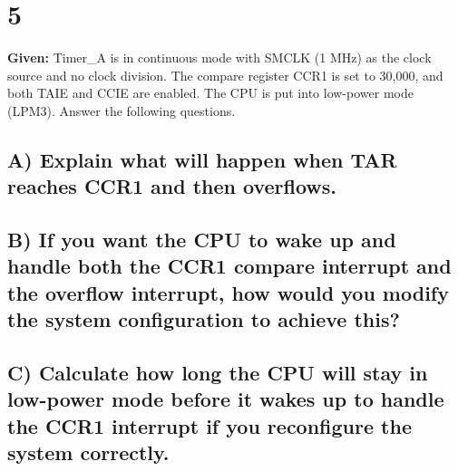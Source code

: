 \documentclass{article}
\begin{document}
\section{5}
\textbf{Given:} Timer\_A is in continuous mode with SMCLK (1 MHz) as the clock source and no clock division. The compare register CCR1 is set to 30,000, and both TAIE and CCIE are enabled. The CPU is put into low-power mode (LPM3). Answer the following questions.

\subsection{A) Explain what will happen when TAR reaches CCR1 and then overflows.}

\subsection{B) If you want the CPU to wake up and handle both the CCR1 compare interrupt and the overflow interrupt, how would you modify the system configuration to achieve this?}

\subsection{C) Calculate how long the CPU will stay in low-power mode before it wakes up to handle the CCR1 interrupt if you reconfigure the system correctly.}
\end{document}
